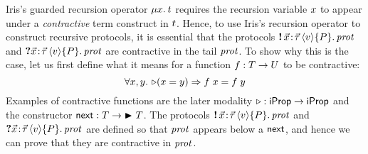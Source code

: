 Iris's guarded recursion operator $\MU \var. \term$ requires the
recursion variable $x$ to appear under a \emph{contractive} term construct in $t$.
Hence, to use Iris's recursion operator to construct recursive protocols, it is
essential that the protocols $\sendprot{\xdots}{\val}{\iprop}{\prot}$ and
$\recvprot{\xdots}{\val}{\iprop}{\prot}$ are contractive in the tail $\mathit{prot}$.
To show why this is the case, let us first define what it means for a function
$f : T \to U$ to be contractive:
\[
\All \var,\varB. \later(\var = \varB) \Ra f\; \var = f\; \varB
\]
Examples of contractive functions are the later modality
$\mathop{{\triangleright}} : \mathsf{iProp} \to \mathsf{iProp}$ and the constructor $\textsf{\upshape next} : T \to \mathord{\blacktriangleright}\ T$.
The protocols $\sendprot{\xdots}{\val}{\iprop}{\prot}$ and
$\recvprot{\xdots}{\val}{\iprop}{\prot}$ are defined so that
$\mathit{prot}$ appears below a $\textsf{\upshape next}$, and hence we can prove
that they are contractive in $\mathit{prot}$.


